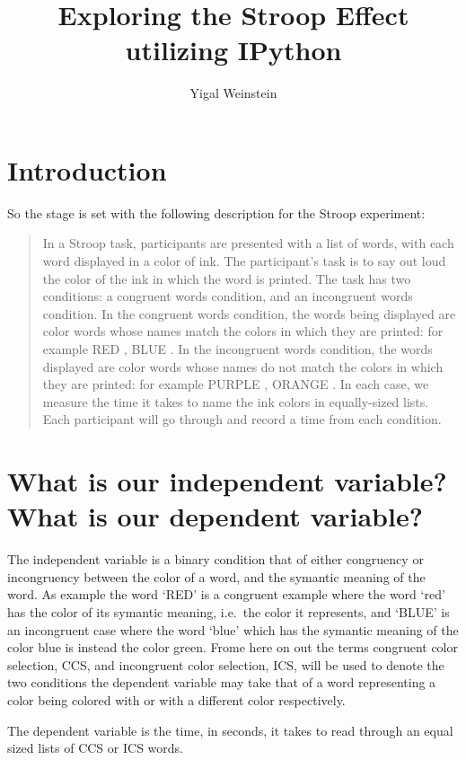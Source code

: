 \documentclass{article}
\title{Exploring the Stroop Effect utilizing IPython}
\author{Yigal Weinstein}
\begin{document}
    
    
\maketitle

\section*{Introduction}
So the stage is set with the following description for the Stroop experiment:
\begin{quote}
In a Stroop task, participants are presented with a list of words, with
each word displayed in a color of ink. The participant's task is to say
out loud the color of the ink in which the word is printed. The task has
two conditions: a congruent words condition, and an incongruent words
condition. In the congruent words condition, the words being displayed
are color words whose names match the colors in which they are printed:
for example {\color{red} RED }, {\color{blue} BLUE }. In the incongruent words condition, the words
displayed are color words whose names do not match the colors in which
they are printed: for example { \color{yellow}PURPLE }, {\color{green} ORANGE }. In each case, we measure
the time it takes to name the ink colors in equally-sized lists. Each
participant will go through and record a time from each condition.
\cite{Udacity-P1-Stroop}
\end{quote}
\section{What is our independent variable? What is our dependent
variable?}\label{what-is-our-independent-variable-what-is-our-dependent-variable}

    The independent variable is a binary condition that of either congruency
or incongruency between the color of a word, and the symantic meaning of
the word. As example the word `RED' is a congruent example where the
word `red' has the color of its symantic meaning, i.e.~the color it
represents, and `BLUE' is an incongruent case where the word `blue'
which has the symantic meaning of the color blue is instead the color
green. Frome here on out the terms congruent color selection, CCS, and
incongruent color selection, ICS, will be used to denote the two
conditions the dependent variable may take that of a word representing a
color being colored with or with a different color respectively.

The dependent variable is the time, in seconds, it takes to read through
an equal sized lists of CCS or ICS words.
\end{document}
